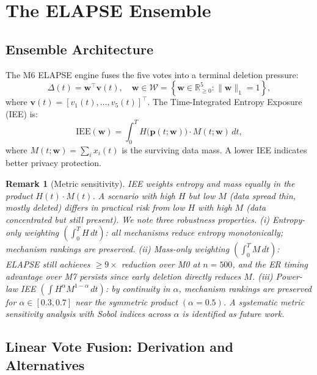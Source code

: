 \documentclass[review,12pt]{elsarticle}
\newcommand{\R}{\mathbb{R}}
\newcommand{\bfw}{\mathbf{w}}
\newcommand{\bfv}{\mathbf{v}}
\newcommand{\IEE}{\mathrm{IEE}}
\newtheorem{remark}{Remark}
\begin{document}
\section{The ELAPSE Ensemble}
\label{sec:ensemble}

\subsection{Ensemble Architecture}

The M6 ELAPSE engine fuses the five votes into a terminal deletion pressure:
\begin{equation}
  \Delta(t) = \bfw^\top \bfv(t), \quad
  \bfw \in \mathcal{W} = \!\left\{\bfw \in \R^5_{\geq 0} : \|\bfw\|_1 = 1\right\},
  \label{eq:ensemble}
\end{equation}
where $\bfv(t) = [v_1(t),\ldots,v_5(t)]^\top$.
The Time-Integrated Entropy Exposure (IEE) is:
\begin{equation}
  \IEE(\bfw) = \int_0^T H\!\bigl(\mathbf{p}(t;\bfw)\bigr)\cdot M(t;\bfw)\,dt,
  \label{eq:iee}
\end{equation}
where $M(t;\bfw) = \sum_i x_i(t)$ is the surviving data mass. A lower
IEE indicates better privacy protection.

\begin{remark}[Metric sensitivity]
\label{rem:metric}
IEE weights entropy and mass equally in the product $H(t)\cdot M(t)$.
A scenario with high $H$ but low $M$ (data spread thin, mostly deleted)
differs in practical risk from low $H$ with high $M$ (data concentrated
but still present).  We note three robustness properties.
\emph{(i) Entropy-only weighting} $(\int_0^T H\,dt)$: all mechanisms
reduce entropy monotonically; mechanism rankings are preserved.
\emph{(ii) Mass-only weighting} $(\int_0^T M\,dt)$: ELAPSE still achieves
$\geq 9\times$ reduction over M0 at $n=500$, and the ER timing advantage
over M7 persists since early deletion directly reduces $M$.
\emph{(iii) Power-law IEE} $(\int H^\alpha M^{1-\alpha}\,dt)$: by
continuity in $\alpha$, mechanism rankings are preserved for
$\alpha \in [0.3, 0.7]$ near the symmetric product $(\alpha = 0.5)$.
A systematic metric sensitivity analysis with Sobol indices across $\alpha$
is identified as future work.
\end{remark}

\subsection{Linear Vote Fusion: Derivation and Alternatives}
\label{sec:fusion_justification}
\end{document}
